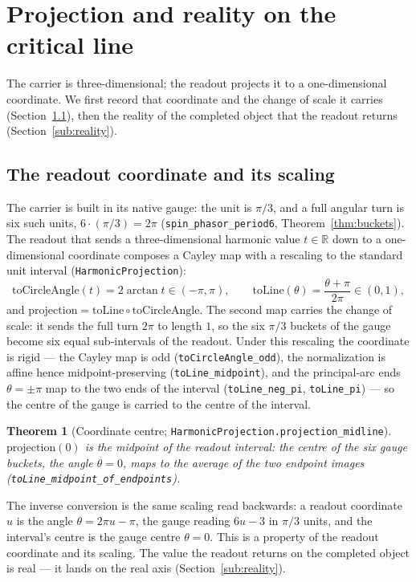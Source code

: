\documentclass[11pt]{article}
\newtheorem{theorem}[definition]{Theorem}
\newcommand{\R}{\mathbb{R}}
\newcommand{\code}[1]{\texttt{#1}}
\begin{document}
\section{Projection and reality on the critical line}\label{sec:projection}

The carrier is three-dimensional; the readout projects it to a one-dimensional coordinate. We first
record that coordinate and the change of scale it carries
(Section~\ref{sub:readout}), then the reality of the completed object that the readout returns
(Section~\ref{sub:reality}).

\subsection{The readout coordinate and its scaling}\label{sub:readout}

The carrier is built in its native gauge: the unit is $\pi/3$, and a full angular turn is six such
units, $6\cdot(\pi/3)=2\pi$ (\code{spin\_phasor\_period6}, Theorem~\ref{thm:buckets}). The readout that
sends a three-dimensional harmonic value $t\in\R$ down to a one-dimensional coordinate composes a
Cayley map \cite{Ahlfors1979} with a rescaling to the standard unit interval (\code{HarmonicProjection}):
\[
  \mathrm{toCircleAngle}(t)=2\arctan t\in(-\pi,\pi),\qquad
  \mathrm{toLine}(\theta)=\frac{\theta+\pi}{2\pi}\in(0,1),
\]
and $\mathrm{projection}=\mathrm{toLine}\circ\mathrm{toCircleAngle}$. The second map carries the change
of scale: it sends the full turn $2\pi$ to length $1$, so the six $\pi/3$ buckets of the gauge become
six equal sub-intervals of the readout. Under this rescaling the coordinate is rigid --- the Cayley
map is odd (\code{toCircleAngle\_odd}), the normalization is affine hence midpoint-preserving
(\code{toLine\_midpoint}), and the principal-arc ends $\theta=\pm\pi$ map to the two ends of the
interval (\code{toLine\_neg\_pi}, \code{toLine\_pi}) --- so the centre of the gauge is carried to the
centre of the interval.

\begin{theorem}[Coordinate centre; \code{HarmonicProjection.projection\_midline}]\label{thm:midline}
$\mathrm{projection}(0)$ is the midpoint of the readout interval: the centre of the six gauge buckets,
the angle $\theta=0$, maps to the average of the two endpoint images
(\code{toLine\_midpoint\_of\_endpoints}).
\end{theorem}

The inverse conversion is the same scaling read backwards: a readout coordinate $u$ is the angle
$\theta=2\pi u-\pi$, the gauge reading $6u-3$ in $\pi/3$ units, and the interval's centre is the gauge
centre $\theta=0$. This is a property of the readout coordinate and its scaling. The value the readout
returns on the completed object is real --- it lands on the real axis (Section~\ref{sub:reality}).
\end{document}
